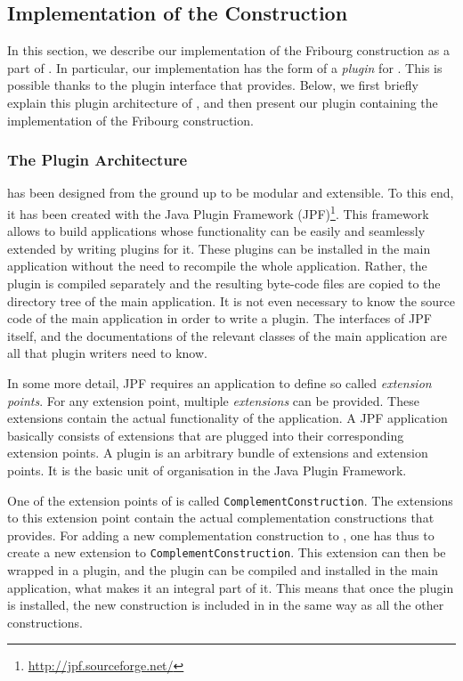 \subsection{Implementation of the Construction}
In this section, we describe our implementation of the Fribourg construction as a part of \goal. In particular, our implementation has the form of a \textit{plugin} for \goal. This is possible thanks to the plugin interface that \goal{} provides. Below, we first briefly explain this plugin architecture of \goal, and then present our plugin containing the implementation of the Fribourg construction.

\label{4_implementation}
\subsubsection{The \goal{} Plugin Architecture}
\goal{} has been designed from the ground up to be modular and extensible. To this end, it has been created with the Java Plugin Framework (JPF)\footnote{\url{http://jpf.sourceforge.net/}}. This framework allows to build applications whose functionality can be easily and seamlessly extended by writing plugins for it. These plugins can be installed in the main application without the need to recompile the whole application. Rather, the plugin is compiled separately and the resulting byte-code files are copied to the directory tree of the main application. It is not even necessary to know the source code of the main application in order to write a plugin. The interfaces of JPF itself, and the documentations of the relevant classes of the main application are all that plugin writers need to know.

In some more detail, JPF requires an application to define so called \textit{extension points}. For any extension point, multiple \textit{extensions} can be provided. These extensions contain the actual functionality of the application. A JPF application basically consists of extensions that are plugged into their corresponding extension points. A plugin is an arbitrary bundle of extensions and extension points. It is the basic unit of organisation in the Java Plugin Framework.

One of the extension points of \goal{} is called \texttt{ComplementConstruction}. The extensions to this extension point contain the actual complementation constructions that \goal{} provides. For adding a new complementation construction to \goal, one has thus to create a new extension to \texttt{ComplementConstruction}. This extension can then be wrapped in a plugin, and the plugin can be compiled and installed in the main application, what makes it an integral part of it. This means that once the plugin is installed, the new construction is included in \goal{} in the same way as all the other constructions.

